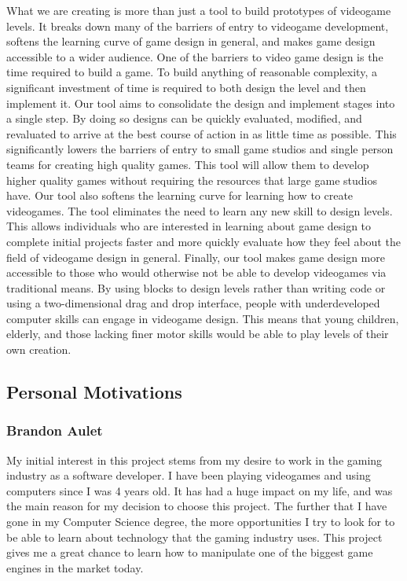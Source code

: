\documentclass[12pt]{article}
\begin{document}
What we are creating is more than just a tool to build prototypes of
videogame levels. It breaks down many of the barriers of entry to
videogame development, softens the learning curve of game design in
general, and makes game design accessible to a wider audience. One of
the barriers to video game design is the time required to build a game.
To build anything of reasonable complexity, a significant investment of
time is required to both design the level and then implement it. Our
tool aims to consolidate the design and implement stages into a single
step. By doing so designs can be quickly evaluated, modified, and
revaluated to arrive at the best course of action in as little time as
possible. This significantly lowers the barriers of entry to small game
studios and single person teams for creating high quality games. This
tool will allow them to develop higher quality games without requiring
the resources that large game studios have. Our tool also softens the
learning curve for learning how to create videogames. The tool
eliminates the need to learn any new skill to design levels. This allows
individuals who are interested in learning about game design to complete
initial projects faster and more quickly evaluate how they feel about
the field of videogame design in general. Finally, our tool makes game
design more accessible to those who would otherwise not be able to
develop videogames via traditional means. By using blocks to design
levels rather than writing code or using a two-dimensional drag and drop
interface, people with underdeveloped computer skills can engage in
videogame design. This means that young children, elderly, and those
lacking finer motor skills would be able to play levels of their own
creation.

\subsection{Personal Motivations}\label{personal-motivations}

\subsubsection{Brandon Aulet}\label{brandon-aulet}

My initial interest in this project stems from my desire to work in the
gaming industry as a software developer. I have been playing videogames
and using computers since I was 4 years old. It has had a huge impact on
my life, and was the main reason for my decision to choose this project.
The further that I have gone in my Computer Science degree, the more
opportunities I try to look for to be able to learn about technology
that the gaming industry uses. This project gives me a great chance to
learn how to manipulate one of the biggest game engines in the market
today.
\end{document}
